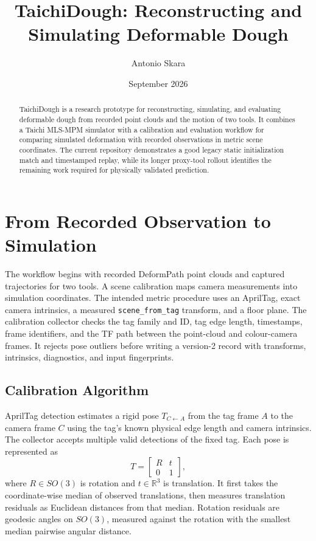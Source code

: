 \documentclass[10pt,a4paper]{article}
\title{\textbf{TaichiDough: Reconstructing and Simulating Deformable Dough}}
\author{Antonio Skara}
\date{September 2026}
\begin{document}
\maketitle

\begin{abstract}
TaichiDough is a research prototype for reconstructing, simulating, and evaluating deformable dough from recorded point clouds and the motion of two tools. It combines a Taichi MLS-MPM simulator with a calibration and evaluation workflow for comparing simulated deformation with recorded observations in metric scene coordinates. The current repository demonstrates a good legacy static initialization match and timestamped replay, while its longer proxy-tool rollout identifies the remaining work required for physically validated prediction.
\end{abstract}

\section{From Recorded Observation to Simulation}

The workflow begins with recorded DeformPath point clouds and captured trajectories for two tools. A scene calibration maps camera measurements into simulation coordinates. The intended metric procedure uses an AprilTag, exact camera intrinsics, a measured \texttt{scene\_from\_tag} transform, and a floor plane. The calibration collector checks the tag family and ID, tag edge length, timestamps, frame identifiers, and the TF path between the point-cloud and colour-camera frames. It rejects pose outliers before writing a version-2 record with transforms, intrinsics, diagnostics, and input fingerprints.

\subsection*{Calibration Algorithm}

AprilTag detection estimates a rigid pose $T_{C\leftarrow A}$ from the tag frame $A$ to the camera frame $C$ using the tag's known physical edge length and camera intrinsics. The collector accepts multiple valid detections of the fixed tag. Each pose is represented as
\[
T = \begin{bmatrix}R & t \\ 0 & 1\end{bmatrix},
\]
where $R\in SO(3)$ is rotation and $t\in\mathbb{R}^3$ is translation. It first takes the coordinate-wise median of observed translations, then measures translation residuals as Euclidean distances from that median. Rotation residuals are geodesic angles on $SO(3)$, measured against the rotation with the smallest median pairwise angular distance.
\end{document}
